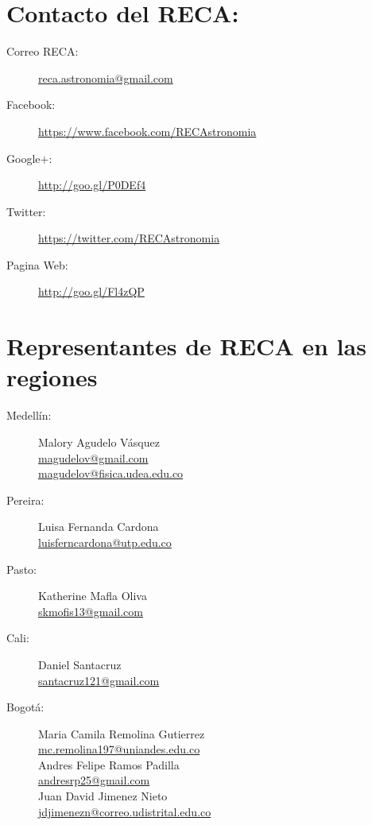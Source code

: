 \documentclass{book}
\begin{document}
\section*{Contacto del RECA:}

\begin{description}
\item[Correo RECA:]\url{reca.astronomia@gmail.com}
\item[Facebook:] \url{https://www.facebook.com/RECAstronomia}
\item[Google$+$:] \url{http://goo.gl/P0DEf4}
\item[Twitter:] \url{https://twitter.com/RECAstronomia}
\item[Pagina Web:] \url{http://goo.gl/Fl4zQP}
\end{description}


\section*{Representantes de RECA en las regiones}
\begin{description}
\item[Medellín:]Malory Agudelo Vásquez\\
\url{magudelov@gmail.com}\\ \url{magudelov@fisica.udea.edu.co}
\item[Pereira:]Luisa Fernanda Cardona\\ \url{luisferncardona@utp.edu.co}
\item[Pasto:]Katherine Mafla Oliva\\
\url{skmofis13@gmail.com}
\item[Cali:]Daniel Santacruz\\
\url{santacruz121@gmail.com}
\item[Bogotá:]Maria Camila Remolina Gutierrez\\
\url{mc.remolina197@uniandes.edu.co}\\

Andres Felipe Ramos Padilla\\
\url{andresrp25@gmail.com}\\

Juan David Jimenez Nieto\\
\url{jdjimenezn@correo.udistrital.edu.co}
\end{description}
\end{document}
